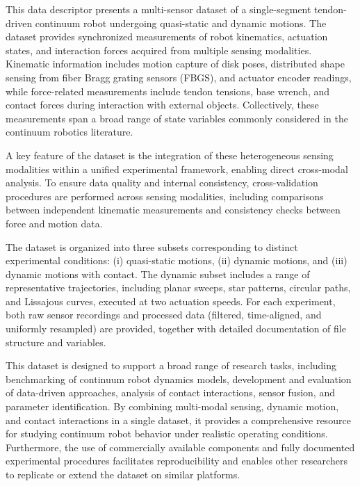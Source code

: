 \documentclass[14pt, a4paper]{article}
\begin{document}
This data descriptor presents a multi-sensor dataset of a single-segment tendon-driven continuum robot undergoing quasi-static and dynamic motions. The dataset provides synchronized measurements of robot kinematics, actuation states, and interaction forces acquired from multiple sensing modalities. Kinematic information includes motion capture of disk poses, distributed shape sensing from fiber Bragg grating sensors (FBGS), and actuator encoder readings, while force-related measurements include tendon tensions, base wrench, and contact forces during interaction with external objects. Collectively, these measurements span a broad range of state variables commonly considered in the continuum robotics literature.

A key feature of the dataset is the integration of these heterogeneous sensing modalities within a unified experimental framework, enabling direct cross-modal analysis. To ensure data quality and internal consistency, cross-validation procedures are performed across sensing modalities, including comparisons between independent kinematic measurements and consistency checks between force and motion data.

The dataset is organized into three subsets corresponding to distinct experimental conditions: (i) quasi-static motions, (ii) dynamic motions, and (iii) dynamic motions with contact. The dynamic subset includes a range of representative trajectories, including planar sweeps, star patterns, circular paths, and Lissajous curves, executed at two actuation speeds. For each experiment, both raw sensor recordings and processed data (filtered, time-aligned, and uniformly resampled) are provided, together with detailed documentation of file structure and variables.

This dataset is designed to support a broad range of research tasks, including benchmarking of continuum robot dynamics models, development and evaluation of data-driven approaches, analysis of contact interactions, sensor fusion, and parameter identification. By combining multi-modal sensing, dynamic motion, and contact interactions in a single dataset, it provides a comprehensive resource for studying continuum robot behavior under realistic operating conditions. Furthermore, the use of commercially available components and fully documented experimental procedures facilitates reproducibility and enables other researchers to replicate or extend the dataset on similar platforms.
\end{document}

